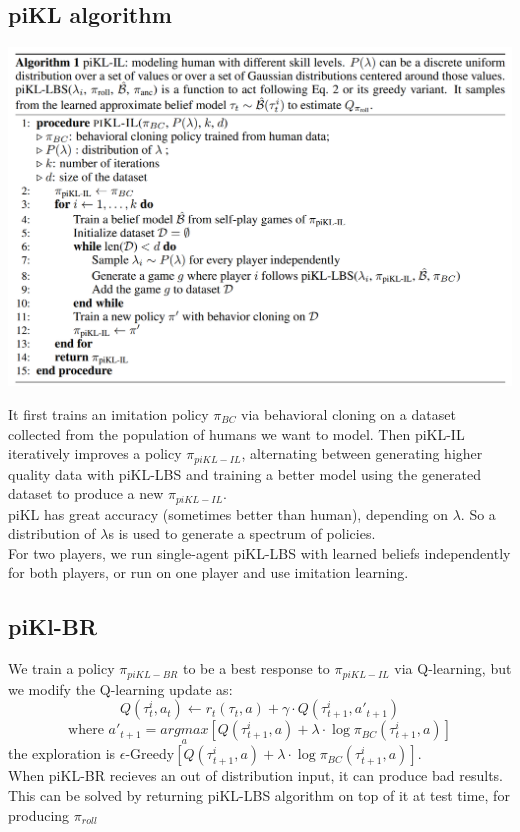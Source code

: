 \documentclass[12pt]{article}
\begin{document}
\subsection{piKL algorithm}
\begin{center}
  \includegraphics*[scale = 0.8]{fig18.png}
\end{center}
It first trains an imitation policy $\pi_{BC}$ via behavioral cloning on a dataset collected from the population of humans we
want to model. Then piKL-IL iteratively improves a policy $\pi_{piKL-IL}$, alternating between generating
higher quality data with piKL-LBS and training a better model using the generated dataset to produce a new $\pi_{piKL-IL}$. \\
piKL has great accuracy (sometimes better than human), depending on $\lambda$. So a distribution of $\lambda$s is used to generate a spectrum of policies.\\
For two players, we run single-agent piKL-LBS with learned
beliefs independently for both players, or run on one player and use imitation learning.
\subsection{piKl-BR}
We train a policy $\pi_{piKL-BR}$ to be a best response to $\pi_{piKL-IL}$ via Q-learning, but we modify
the Q-learning update as:
\[Q(\tau_t^i,a_t)\leftarrow r_t(\tau_t,a)+\gamma\cdot Q(\tau_{t+1}^i,a'_{t+1})\]
\[\text{where }a'_{t+1} = \underset{a}{argmax}\left[Q(\tau_{t+1}^i,a)+\lambda\cdot\log \pi_{BC}(\tau_{t+1}^i,a)\right]\]
the exploration is $\epsilon$-Greedy$\left[Q(\tau_{t+1}^i,a)+\lambda\cdot\log \pi_{BC}(\tau_{t+1}^i,a)\right]$.\\
When piKL-BR recieves an out of distribution input, it can produce bad results. This can be solved by returning piKL-LBS algorithm on top of it at test time, for producing $\pi_{roll}$
\end{document}
